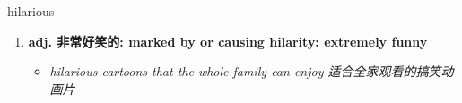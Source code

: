 
\begin{frame}
{\huge hilarious}
\begin{center}
\begin{enumerate}\Large
  \item \textbf{adj. 非常好笑的: marked by or causing hilarity: extremely funny}
  \begin{itemize}
    \item \em{\Large{hilarious cartoons that the whole family can enjoy 适合全家观看的搞笑动画片}}
  \end{itemize}
\end{enumerate}
\end{center}
\end{frame}

